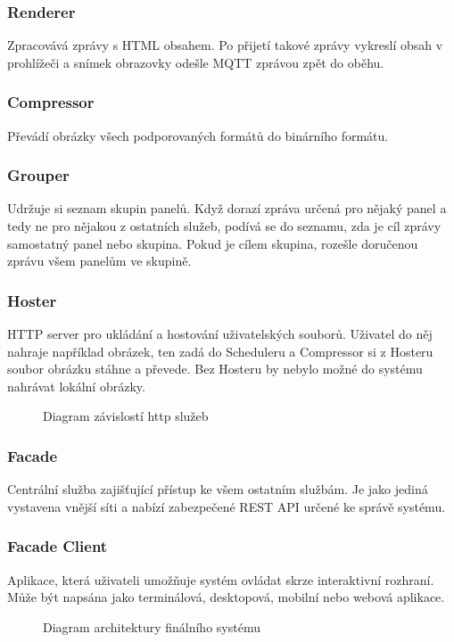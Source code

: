 \subsubsection*{Renderer}
Zpracovává zprávy s HTML obsahem. Po přijetí takové zprávy vykreslí obsah v prohlížeči a snímek obrazovky odešle MQTT zprávou zpět do oběhu.

\subsubsection*{Compressor}
Převádí obrázky všech podporovaných formátů do binárního formátu.

\subsubsection*{Grouper}
Udržuje si seznam skupin panelů. Když dorazí zpráva určená pro nějaký panel a tedy ne pro nějakou z ostatních služeb, podívá se do seznamu, zda je cíl zprávy samostatný panel nebo skupina. Pokud je cílem skupina, rozešle doručenou zprávu všem panelům ve skupině.

\subsubsection*{Hoster}
HTTP server pro ukládání a hostování uživatelských souborů. Uživatel do něj nahraje například obrázek, ten zadá do Scheduleru a Compressor si z Hosteru soubor obrázku stáhne a převede. Bez Hosteru by nebylo možné do systému nahrávat lokální obrázky.

\vspace{1cm}
\begin{figure}[h]
    \centering
    
    \caption{Diagram závislostí http služeb}
    \label{fig:final-system-http-services}
\end{figure}

\subsubsection*{Facade}
Centrální služba zajišťující přístup ke všem ostatním službám. Je jako jediná vystavena vnější síti a nabízí zabezpečené REST API určené ke správě systému.

\subsubsection*{Facade Client}
Aplikace, která uživateli umožňuje systém ovládat skrze interaktivní rozhraní. Může být napsána jako terminálová, desktopová, mobilní nebo webová aplikace.

\vspace{1cm}
\begin{figure}[h]
    \centering
    
    \caption{Diagram architektury finálního systému}
    \label{fig:final-system-architecture}
\end{figure}